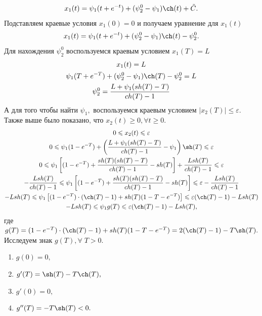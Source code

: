 \documentclass[11pt]{article}
\begin{document}
\begin{enumerate}
\begin{itemize}
\begin{gather*}
				x_1(t) = \psi_1(t + e^{-t}) + (\psi_2^0 - \psi_1) \ch(t) + \tilde{C}.
   			\end{gather*}
			Подставляем краевые условия $ x_1(0) = 0 $ и получаем уравнение для $ x_1(t) $
			\begin{gather*}
				x_1(t) = \psi_1(t + e^{-t}) + (\psi_2^0 - \psi_1) \ch(t) - \psi_2^0.
   			\end{gather*}
   			Для нахождения $ \psi_2^0 $ воспользуемся краевым условием $ x_1(T) = L $
   			\begin{gather*}
				x_1(t) = L \\
				\psi_1(T + e^{-T}) + (\psi_2^0 - \psi_1) \ch(T) - \psi_2^0 = L \\
				\psi_2^0 = \frac{L + \psi_1(sh(T) - T)}{ch(T) - 1}
   			\end{gather*}
   			А для того чтобы найти $ \psi_1, $ воспользуемся краевым условием $ \vert x_2(T) \vert \leqslant \varepsilon. $ Также выше было показано, что $ x_2(t) \geqslant 0, \forall t \geqslant 0. $
   			\begin{gather*}
   				0 \leqslant x_2(t) \leqslant \varepsilon \\
			 	0 \leqslant \psi_1(1 - e^{-T}) + \left(\frac{L + \psi_1(sh(T) - T)}{ch(T) - 1} - \psi_1 \right)\sh(T) \leqslant \varepsilon \\
				0 \leqslant \psi_1 \left[ (1 - e^{-T}) + \frac{sh(T)(sh(T) - T)}{ch(T) - 1} - sh(T) \right] + \frac{L sh(T)}{ch(T) - 1} \leqslant \varepsilon \\
				-\frac{L sh(T)}{ch(T) - 1} \leqslant \psi_1 \left[ (1 - e^{-T}) + \frac{sh(T)(sh(T) - T)}{ch(T) - 1} - sh(T) \right]  \leqslant \varepsilon - \frac{L sh(T)}{ch(T) - 1} \\
				-L sh(T) \leqslant \psi_1 \left[ (1 - e^{-T}) \cdot (\ch(T) - 1) + sh(T)(1 - T - e^{-T}) \right]  \leqslant \varepsilon(\ch(T) - 1) - L sh(T) \\
				-L sh(T) \leqslant \psi_1 g(T) \leqslant\varepsilon(\ch(T) - 1) - L sh(T),
   			\end{gather*}
   			где $ g(T) = (1 - e^{-T}) \cdot (\ch(T) - 1) + sh(T)(1 - T - e^{-T}) = 2(\ch(T) - 1) - T \sh(T). $ Исследуем знак $ g(T), \forall \; T > 0. $
   			\begin{enumerate}
				\item $ g(0) = 0, $
				\item $ g'(T) = \sh(T) - T \ch(T), $
				\item $ g'(0) = 0, $
				\item $ g''(T) = -T \sh(T) < 0. $  			
   			\end{enumerate}

\end{itemize}
\end{enumerate}
\end{document}
